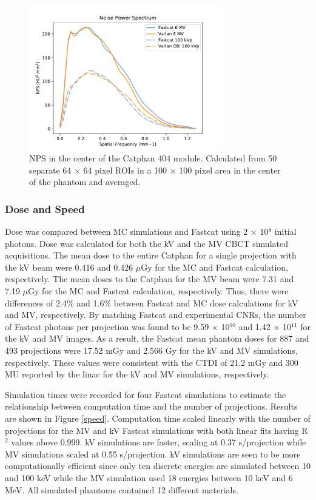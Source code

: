 \begin{figure}[ht!]
  \begin{center}
  \includegraphics[width=0.75\textwidth, clip]{figures/NPS.pdf}
  \caption{
  NPS in the center of the Catphan 404 module. Calculated from 50 separate 64 $\times$ 64 pixel ROIs in a 100 $\times$ 100 pixel area in the center of the phantom and averaged. \label{NPS}}
    \end{center}
\end{figure}

\subsubsection{Dose and Speed}

Dose was compared between MC simulations and Fastcat using 2 $\times$ 10$^8$ initial photons. Dose was calculated for both the kV and the MV CBCT simulated acquisitions. The mean dose to the entire Catphan for a single projection with the kV beam were 0.416 and 0.426 $\mu$Gy for the MC and Fastcat calculation, respectively. The mean doses to the Catphan for the MV beam were 7.31 and 7.19 $\mu$Gy for the MC and Fastcat calculation, respectively. Thus, there were differences of 2.4\% and 1.6\% between Fastcat and MC dose calculations for kV and MV, respectively. By matching Fastcat and experimental CNRs, the number of Fastcat photons per projection was found to be 9.59 $\times$ 10$^{10}$ and 1.42 $\times$ 10$^{11}$ for the kV and MV images. As a result, the Fastcat mean phantom doses for 887 and 493 projections were 17.52 mGy and 2.566 Gy for the kV and MV simulations, respectively. These values were  consistent with the CTDI of 21.2 mGy and 300 MU reported by the linac for the kV and MV simulations, respectively.


Simulation times were recorded for four Fastcat simulations to estimate the relationship between computation time and the number of projections. Results are shown in Figure \ref{speed}. Computation time scaled linearly with the number of projections for the MV and kV Fastcat simulations with both linear fits having R$^2$ values above 0.999. kV simulations are faster, scaling at 0.37 s/projection while MV simulations scaled at 0.55 s/projection. kV simulations are seen to be more computationally efficient since only ten discrete energies are simulated between 10 and 100 keV while the MV simulation used 18 energies between 10 keV and 6 MeV. All simulated phantoms contained 12 different materials.

